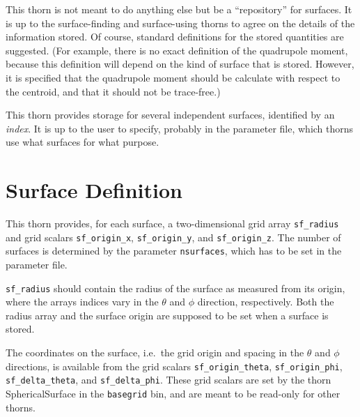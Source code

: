 This thorn is not meant to do anything else but be a ``repository''
for surfaces.  It is up to the surface-finding and surface-using
thorns to agree on the details of the information stored.  Of course,
standard definitions for the stored quantities are suggested.  (For
example, there is no exact definition of the quadrupole moment,
because this definition will depend on the kind of surface that is
stored.  However, it is specified that the quadrupole moment should be
calculate with respect to the centroid, and that it should not be
trace-free.)

This thorn provides storage for several independent surfaces,
identified by an \emph{index}.  It is up to the user to specify,
probably in the parameter file, which thorns use what surfaces for
what purpose.



\section{Surface Definition}

This thorn provides, for each surface, a two-dimensional grid array
\texttt{sf\_radius} and grid scalars \texttt{sf\_origin\_x},
\texttt{sf\_origin\_y}, and \texttt{sf\_origin\_z}.  The number of
surfaces is determined by the parameter \texttt{nsurfaces}, which has
to be set in the parameter file.

\texttt{sf\_radius} should contain the radius of the surface as
measured from its origin, where the arrays indices vary in the
$\theta$ and $\phi$ direction, respectively.  Both the radius array
and the surface origin are supposed to be set when a surface is
stored.

The coordinates on the surface, i.e.\ the grid origin and spacing in
the $\theta$ and $\phi$ directions, is available from the grid scalars
\texttt{sf\_origin\_theta}, \texttt{sf\_origin\_phi},
\texttt{sf\_delta\_theta}, and \texttt{sf\_delta\_phi}.  These grid
scalars are set by the thorn SphericalSurface in the \texttt{basegrid}
bin, and are meant to be read-only for other thorns.



